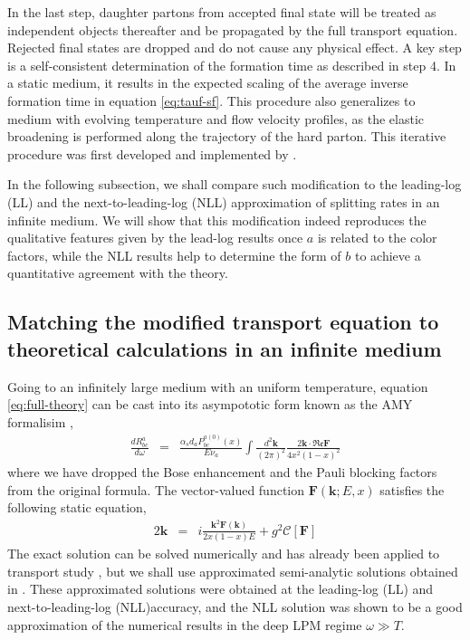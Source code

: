 \documentclass[aps, prc, reprint, amsmath, groupedaddress, nofootinbib]{revtex4-1}
\begin{document}
In the last step, daughter partons from accepted final state will be treated as independent objects thereafter and be propagated by the full transport equation.
Rejected final states are dropped and do not cause any physical effect. 
A key step is a self-consistent determination of the formation time as described in step 4. 
In a static medium, it results in the expected scaling of the average inverse formation time in equation \ref{eq:tauf-sf}.
This procedure also generalizes to medium with evolving temperature and flow velocity profiles, as the elastic broadening is performed along the trajectory of the hard parton.
This iterative procedure was first developed and implemented by \cite{Zapp:2011ya}.

In the following subsection, we shall compare such modification to the leading-log (LL) and the next-to-leading-log (NLL) approximation of splitting rates in an infinite medium. 
We will show that this modification indeed reproduces the qualitative features given by the lead-log results once $a$ is related to the color factors, while the NLL results help to determine the form of $b$ to achieve a quantitative agreement with the theory.

\subsection{Matching the modified transport equation to theoretical calculations in an infinite medium}
Going to an infinitely large medium with an uniform temperature, equation \ref{eq:full-theory} can be cast into its asympototic form known as the AMY formalisim \cite{Arnold:2002ja,Arnold:2002zm,Arnold:2003zc},
\begin{eqnarray}\label{eq:AMY-1}
\frac{dR^a_{bc}}{d\omega} &=& \frac{\alpha_s d_a P^{a(0)}_{bc}(x)}{E\nu_a} \int\frac{d^2\mathbf{k}}{(2\pi)^2} \frac{2\mathbf{k}\cdot \mathfrak{Re} \mathbf{F}}{4x^2(1-x)^2}
\end{eqnarray}
where we have dropped the Bose enhancement and the Pauli blocking factors from the original formula.
The vector-valued function $\mathbf{F}(\mathbf{k}; E, x)$ satisfies the following static equation,
\begin{eqnarray}\label{eq:AMY-2}
2\mathbf{k} &=& i\frac{\mathbf{k}^2 \mathbf{F}(\mathbf{k})}{2x(1-x)E} + g^2 \mathcal{C}[\mathbf{F}]
\end{eqnarray} 
The exact solution can be solved numerically and has already been applied to transport study \cite{Jeon:2003gi,Schenke:2009gb}, but we shall use approximated semi-analytic solutions obtained in \cite{Arnold:2008zu}.
These approximated solutions were obtained at the leading-log (LL) and next-to-leading-log (NLL)accuracy, and the NLL solution was shown to be a good approximation of the numerical results in the deep LPM regime $\omega \gg T$.
\end{document}
